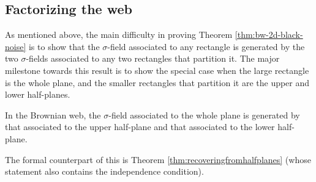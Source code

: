 {\subsection{Factorizing the web}

As mentioned above, the main difficulty in proving
Theorem \ref{thm:bw-2d-black-noise} is to show that the $\sigma$-field
associated to any rectangle is generated by the two $\sigma$-fields
associated to any two rectangles that partition it.
The major milestone towards this result is to show the special case
when the large rectangle is the whole plane, and the smaller
rectangles that partition it are the upper and lower half-planes.

\begin{theorem}
\label{thm:informal-recovering-from-half-planes}
In the Brownian web, the $\sigma$-field associated to the whole plane
is generated by that associated to the upper half-plane and that
associated to the lower half-plane.
\end{theorem}

The formal counterpart of this is
Theorem \ref{thm:recoveringfromhalfplanes} (whose statement also
contains the independence condition).


}
